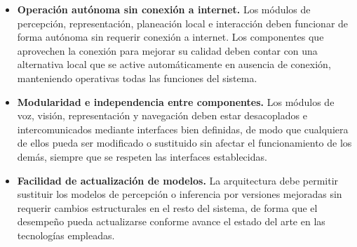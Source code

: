 \begin{itemize}

    \item[\textbf{RNF-13}] \textbf{Operación autónoma sin conexión a internet.}
    Los módulos de percepción, representación, planeación local e interacción deben
    funcionar de forma autónoma sin requerir conexión a internet. Los componentes que
    aprovechen la conexión para mejorar su calidad deben contar con una alternativa local
    que se active automáticamente en ausencia de conexión, manteniendo operativas todas
    las funciones del sistema.

    \item[\textbf{RNF-14}] \textbf{Modularidad e independencia entre componentes.}
    Los módulos de voz, visión, representación y navegación deben estar desacoplados e
    intercomunicados mediante interfaces bien definidas, de modo que cualquiera de ellos
    pueda ser modificado o sustituido sin afectar el funcionamiento de los demás, siempre
    que se respeten las interfaces establecidas.

    \item[\textbf{RNF-15}] \textbf{Facilidad de actualización de modelos.}
    La arquitectura debe permitir sustituir los modelos de percepción o inferencia por
    versiones mejoradas sin requerir cambios estructurales en el resto del sistema, de forma
    que el desempeño pueda actualizarse conforme avance el estado del arte en las tecnologías
    empleadas.

\end{itemize}